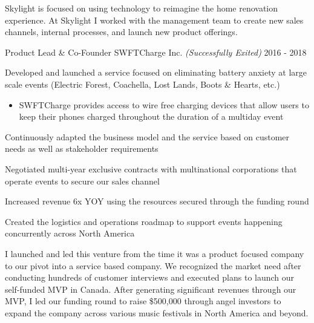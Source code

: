 \begin{cventries}
{\begin{cvitems}
    \end{cvitems}
    }
    {
    \begin{cventrysummary}
    Skylight is focused on using technology to reimagine the home renovation experience. At Skylight I worked with the management team to create new sales channels, internal processes, and launch new product offerings.
    \end{cventrysummary}
    }
  \cventry
    {Product Lead \& Co-Founder} %
    {SWFTCharge Inc.
   \textit{\textcolor{awesome}{(Successfully Exited)}}
    } %
    {} %
    {2016 - 2018} %
    {
    \begin{cvitems} %
        \item {Developed and launched a service focused on eliminating battery anxiety at large scale events (Electric Forest, Coachella, Lost Lands, Boots \& Hearts, etc.)
        \begin{itemize}
            \item {SWFTCharge provides access to wire free charging devices that allow users to keep their phones charged throughout the duration of a multiday event}
        \end{itemize}
        \item {Continuously adapted the business model and the service based on customer needs as well as stakeholder requirements}
        \item {Negotiated multi-year exclusive contracts with multinational corporations that operate events to secure our sales channel}
        \item {Increased revenue 6x YOY using the resources secured through the funding round}
        \item {Created the logistics and operations roadmap to support events happening concurrently across North America}}
    \end{cvitems}
    }
    {
    \begin{cventrysummary}
        I launched and led this venture from the time it was a product focused company to our pivot into a service based company. We recognized the market need after conducting hundreds of customer interviews and executed plans to launch our self-funded MVP in Canada. After generating significant revenues through our MVP, I led our funding round to raise \$500,000 through angel investors to expand the company across various music festivals in North America and beyond.
    \end{cventrysummary} 
    }
\end{cventries}
